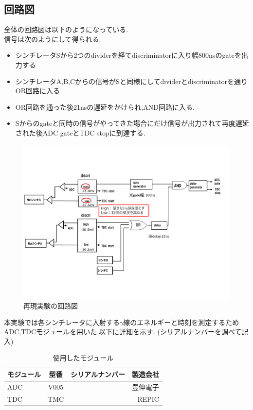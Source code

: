\subsection{回路図}
全体の回路図は以下のようになっている.~\cite{卒業論文2015}\\
信号は次のようにして得られる.
\begin{itemize}
		\item シンチレータSから2つのdividerを経てdiscriminatorに入り幅800nsのgateを出力する
		\item シンチレータA,B,Cからの信号がSと同様にしてdividerとdiscriminatorを通りOR回路に入る
		\item OR回路を通った後21nsの遅延をかけられ,AND回路に入る.
		\item Sからのgateと同時の信号がやってきた場合にだけ信号が出力されて再度遅延された後ADC gateとTDC stopに到達する.
\end{itemize}
\begin{figure}[htbp]
	\centering
		\includegraphics[width=15cm]{fig/isb/circuit.pdf}
		\caption{再現実験の回路図}
		\label{fig:circuit2015}
\end{figure}

本実験では各シンチレータに入射する$\gamma$線のエネルギーと時刻を測定するためADC,TDCモジュールを用いた.以下に詳細を示す.
(シリアルナンバーを調べて記入)
\begin{table}[htbp]
	\centering
		\caption{使用したモジュール}
		\begin{tabular}{|l|c|r|r|} \hline
			モジュール & 型番 & シリアルナンバー & 製造会社 \\ \hline \hline
			ADC & V005 & & 豊伸電子 \\ \hline
			TDC & TMC & & REPIC \\ \hline
		\end{tabular}
		\label{module}
\end{table}


